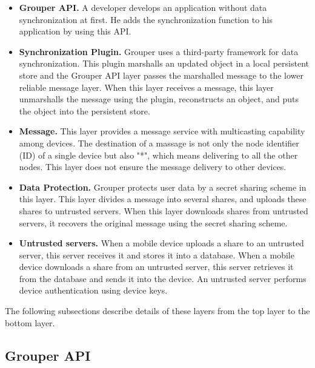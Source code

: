 \documentclass[twocolumn,10pt]{article}
\begin{document}
\begin{itemize}
	\setlength{\itemsep}{1pt}
	\setlength{\parskip}{0pt}
	\setlength{\parsep}{0pt}
	\item \textbf{Grouper API.}
	A developer develops an application without data synchronization at first. 
	He adds the synchronization function to his application by using this API.
	\item \textbf{Synchronization Plugin.} 
	Grouper uses a third-party framework for data synchronization.
	This plugin marshalls an updated object in a local persistent store and the Grouper API layer passes the marshalled message to the lower reliable message layer.
	When this layer receives a message, this layer unmarshalls the message using the plugin, reconstructs an object, and puts the object into the persistent store.
	\item \textbf{Message.}
	This layer provides a message service with multicasting capability among devices.
	The destination of a massage is not only the node identifier (ID) of a single device but also "*", which means delivering to all the other nodes.
	This layer does not ensure the message delivery to other devices.
	\item \textbf{Data Protection.}
	Grouper protects user data by a secret sharing scheme in this layer.
	This layer divides a message into several shares, and uploads these shares to untrusted servers.
	When this layer downloads shares from untrusted servers, it recovers the original message using the secret sharing scheme.
	\item \textbf{Untrusted servers.}
	When a mobile device uploads a share to an untrusted server, this server receives it and stores it into a database.
	When a mobile device downloads a share from an untrusted server, this server retrieves it from the database and sends it into the device.
	An untrusted server performs device authentication using device keys.
\end{itemize}

The following subsections describe details of these layers from the top layer to the bottom layer.

\subsection{Grouper API}
\end{document}
